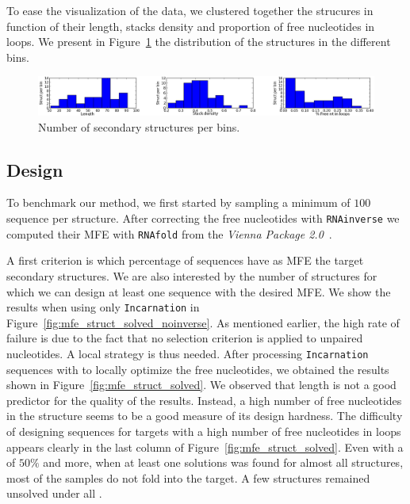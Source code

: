  To ease the visualization of the data, we clustered together the strucures
 in function of their length, stacks density and proportion of free 
 nucleotides in loops. We present in Figure~\ref{fig:bins} the distribution
 of the structures in the different bins.
 
 \begin{figure}[ht!]
 	\centering
	\includegraphics[width=\textwidth]{Figures/bins_distribution.png}
	\caption{Number of secondary structures per bins.}
	\label{fig:bins}
 \end{figure}
 
 
\subsection{Design}
 To benchmark our method, we first started by sampling a minimum
 of $100$ sequence per structure. After correcting the free nucleotides with
 \texttt{RNAinverse} we computed their MFE with \texttt{RNAfold} from the \textit{Vienna Package 2.0}~\cite{Hofacker:1994}.
 
A first criterion is which percentage of sequences have as MFE the target
secondary structures. We are also interested by the number of structures
for which we can design at least one sequence with the desired MFE.
We show the results when using only \texttt{Incarnation} in 
 Figure~\ref{fig:mfe_struct_solved_noinverse}. As mentioned earlier, the high rate of failure
is due to the fact that no selection criterion is applied to
unpaired nucleotides. A local strategy is thus needed.
After processing \texttt{Incarnation} sequences with \RNAinverse to 
locally optimize the free nucleotides, we obtained the results 
shown in Figure~\ref{fig:mfe_struct_solved}. We observed
that length is not a good predictor for the quality of the results. Instead,
a high number of free nucleotides in the structure seems to be a 
good measure of its design hardness. 
 The difficulty of 
designing sequences for targets with a high number of free nucleotides 
 in loops appears clearly in the last column of Figure~\ref{fig:mfe_struct_solved}.
Even with a \GCContent of $50\%$ and more, when at least
one solutions was found for almost all structures, most of the samples 
do not fold into the target. A few structures remained unsolved under
all \GCContent.



